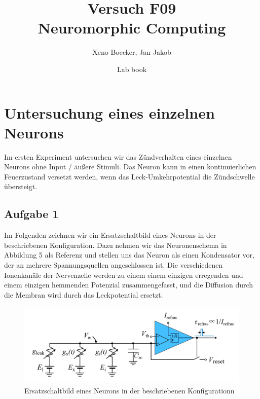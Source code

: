 \documentclass[10pt,a4paper]{scrartcl}
\title{Versuch F09\\ Neuromorphic Computing}
\date{Lab book}
\author{Xeno Boecker, Jan Jakob}
\date{}
\begin{document}

\thispagestyle{empty}  %
 \maketitle

\newpage
\tableofcontents



\newpage



\section{Untersuchung eines einzelnen Neurons}

Im ersten Experiment untersuchen wir das Zündverhalten eines einzelnen Neurons ohne Input / äußere Stimuli. Das Neuron kann in einen kontinuierlichen Feuerzustand versetzt werden, wenn das Leck-Umkehrpotential die Zündschwelle übersteigt.

\subsection{Aufgabe 1}
Im Folgenden zeichnen wir ein Ersatzschaltbild eines Neurons in der beschriebenen Konfiguration. Dazu nehmen wir das Neuronenschema in Abbildung 5 als Referenz und stellen uns das Neuron als einen Kondensator vor, der an mehrere Spannungsquellen angeschlossen ist. Die verschiedenen Ionenkanäle der Nervenzelle werden zu einem
einem einzigen erregenden und einem einzigen hemmenden Potenzial zusammengefasst, und die Diffusion durch die Membran wird durch das Leckpotential ersetzt.

\begin{figure} [ht]
\begin{center}
\includegraphics[scale=0.5]{pictures/Neuron_Circuit.png}
\caption{Ersatzschaltbild eines Neurons in der beschriebenen Konfigurationn}
\label{fig:schaltung1}
\end{center}
\end{figure}
\end{document}
